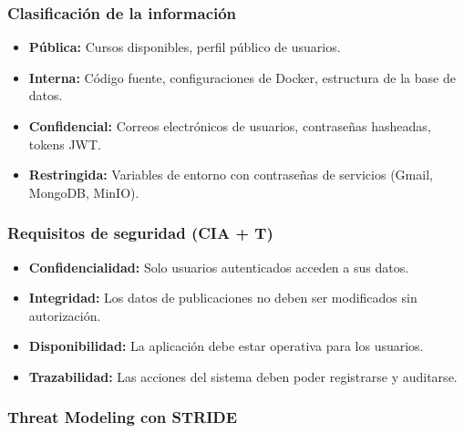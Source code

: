 \subsubsection{Clasificación de la información}

\begin{itemize}
    \renewcommand{\labelitemi}{--}
    \item \textbf{Pública:} Cursos disponibles, perfil público de usuarios.
    \item \textbf{Interna:} Código fuente, configuraciones de Docker, estructura de la base de datos.
    \item \textbf{Confidencial:} Correos electrónicos de usuarios, contraseñas hasheadas, tokens JWT.
    \item \textbf{Restringida:} Variables de entorno con contraseñas de servicios (Gmail, MongoDB, MinIO).
\end{itemize}

\subsubsection{Requisitos de seguridad (CIA + T)}

\begin{itemize}
    \item \textbf{Confidencialidad:} Solo usuarios autenticados acceden a sus datos.
    \item \textbf{Integridad:} Los datos de publicaciones no deben ser modificados sin autorización.
    \item \textbf{Disponibilidad:} La aplicación debe estar operativa para los usuarios.
    \item \textbf{Trazabilidad:} Las acciones del sistema deben poder registrarse y auditarse.
\end{itemize}

\subsubsection{Threat Modeling con STRIDE}

\begin{table}[h]
\centering
\small
{}
\caption{Análisis STRIDE de Workcodile-dev}
\label{tab:stride-workcodile}
\end{table}


